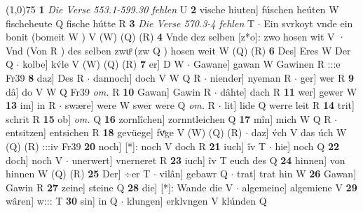\documentclass[8pt,a4paper,notitlepage]{article}
\begin{document}
\begin{table}[ht]
\begin{minipage}[t]{0.5\linewidth}
\line(1,0){75} \newline
\textbf{1} \textit{Die Verse 553.1-599.30 fehlen} U  \textbf{2} vische hiuten] fúschen heúten W fischeheute Q fische hútte R \textbf{3} \textit{Die Verse 570.3-4 fehlen} T   $\cdot$ Ein svrkoyt vnde ein bonit (bomeit W ) V (W) (Q) (R) \textbf{4} Vnde dez selben [z*o]: zwo hosen wit V · Vnd (Von R ) des selben zwuͦ (zw Q ) hosen weit W (Q) (R) \textbf{6} Des] Eres W Der Q  $\cdot$ kolbe] kv́le V (W) (Q) (R) \textbf{7} er] D W  $\cdot$ Gawane] gawan W Gawinen R :::e Fr39 \textbf{8} daz] Des R  $\cdot$ dannoch] doch V W Q R  $\cdot$ niender] nyeman R  $\cdot$ ger] wer R \textbf{9} dâ] do V W Q Fr39 \textit{om.} R \textbf{10} Gawan] Gawin R  $\cdot$ dâhte] dach R \textbf{11} wer] gewer W \textbf{13} im] in R  $\cdot$ swære] were W swer were Q \textit{om.} R  $\cdot$ lit] lide Q werre leit R \textbf{14} trit] schrit R \textbf{15} ob] \textit{om.} Q \textbf{16} zornlîchen] zornntleichen Q \textbf{17} mîn] mich W Q R  $\cdot$ entsitzen] entsichen R \textbf{18} gevüege] fvͤge V (W) (Q) (R)  $\cdot$ daz] v́ch V das úch W (Q) (R) :::iv Fr39 \textbf{20} noch] [*]: noch V doch R \textbf{21} iuch] îv T  $\cdot$ hie] noch Q \textbf{22} doch] noch V  $\cdot$ unerwert] vnerneret R \textbf{23} iuch] îv T euch des Q \textbf{24} hinnen] von hinnen W (Q) (R) \textbf{25} Der] ÷er T  $\cdot$ vilân] gebawr Q  $\cdot$ trat] trat hin W \textbf{26} Gawan] Gawin R \textbf{27} zeine] steine Q \textbf{28} die] [*]: Wande die V  $\cdot$ algemeine] algemiene V \textbf{29} wâren] w::: T \textbf{30} sin] in Q  $\cdot$ klungen] erklvngen V klúnden Q \newline
\end{minipage}
\end{table}
\end{document}
